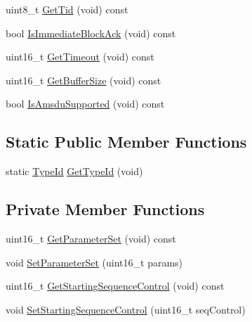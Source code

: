 \begin{DoxyCompactItemize}
\item 
uint8\+\_\+t \hyperlink{classns3_1_1MgtAddBaRequestHeader_ab4d890cd3fd2cd11b15da17c8b35bf69}{Get\+Tid} (void) const 
\item 
bool \hyperlink{classns3_1_1MgtAddBaRequestHeader_ae4b878b7857cd210218d1bca50e69185}{Is\+Immediate\+Block\+Ack} (void) const 
\item 
uint16\+\_\+t \hyperlink{classns3_1_1MgtAddBaRequestHeader_a108b536808a305fd95d2452828200a02}{Get\+Timeout} (void) const 
\item 
uint16\+\_\+t \hyperlink{classns3_1_1MgtAddBaRequestHeader_a8afbf89f169af6ef70ce17cc8e204d58}{Get\+Buffer\+Size} (void) const 
\item 
bool \hyperlink{classns3_1_1MgtAddBaRequestHeader_abbb0f7e7dc240a98806c55d9c72abc0c}{Is\+Amsdu\+Supported} (void) const 
\end{DoxyCompactItemize}
\subsection*{Static Public Member Functions}
\begin{DoxyCompactItemize}
\item 
static \hyperlink{classns3_1_1TypeId}{Type\+Id} \hyperlink{classns3_1_1MgtAddBaRequestHeader_ac4bbc2419ffe4a2748a44305a6db6b33}{Get\+Type\+Id} (void)
\end{DoxyCompactItemize}
\subsection*{Private Member Functions}
\begin{DoxyCompactItemize}
\item 
uint16\+\_\+t \hyperlink{classns3_1_1MgtAddBaRequestHeader_a443fc8ef380dc44229cdb41e2c647e2a}{Get\+Parameter\+Set} (void) const 
\item 
void \hyperlink{classns3_1_1MgtAddBaRequestHeader_a09169a2d142de4f4d6f504a6074ce6a9}{Set\+Parameter\+Set} (uint16\+\_\+t params)
\item 
uint16\+\_\+t \hyperlink{classns3_1_1MgtAddBaRequestHeader_a77a6232b2d1013dd83cb79cbb9743400}{Get\+Starting\+Sequence\+Control} (void) const 
\item 
void \hyperlink{classns3_1_1MgtAddBaRequestHeader_a2a084dc3fcaf6202c3c9abcd279042dd}{Set\+Starting\+Sequence\+Control} (uint16\+\_\+t seq\+Control)
\end{DoxyCompactItemize}
